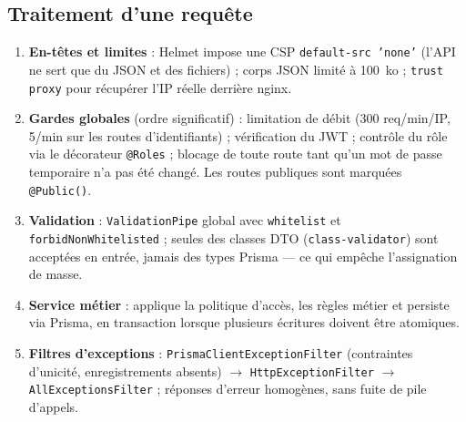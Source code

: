 \documentclass[10.5pt,a4paper]{article}
\newcommand{\code}[1]{\texttt{\small #1}}
\begin{document}
\subsection{Traitement d'une requête}
\begin{enumerate}
  \item \textbf{En-têtes et limites} : Helmet impose une CSP \code{default-src 'none'} (l'API ne sert que du JSON et des fichiers) ; corps JSON limité à 100~ko ; \code{trust proxy} pour récupérer l'IP réelle derrière nginx.
  \item \textbf{Gardes globales} (ordre significatif) : limitation de débit (300 req/min/IP, 5/min sur les routes d'identifiants) ; vérification du JWT ; contrôle du rôle via le décorateur \code{@Roles} ; blocage de toute route tant qu'un mot de passe temporaire n'a pas été changé. Les routes publiques sont marquées \code{@Public()}.
  \item \textbf{Validation} : \code{ValidationPipe} global avec \code{whitelist} et \code{forbidNonWhitelisted} ; seules des classes DTO (\code{class-validator}) sont acceptées en entrée, jamais des types Prisma --- ce qui empêche l'assignation de masse.
  \item \textbf{Service métier} : applique la politique d'accès, les règles métier et persiste via Prisma, en transaction lorsque plusieurs écritures doivent être atomiques.
  \item \textbf{Filtres d'exceptions} : \code{PrismaClientExceptionFilter} (contraintes d'unicité, enregistrements absents) $\rightarrow$ \code{HttpExceptionFilter} $\rightarrow$ \code{AllExceptionsFilter} ; réponses d'erreur homogènes, sans fuite de pile d'appels.
\end{enumerate}
\end{document}

